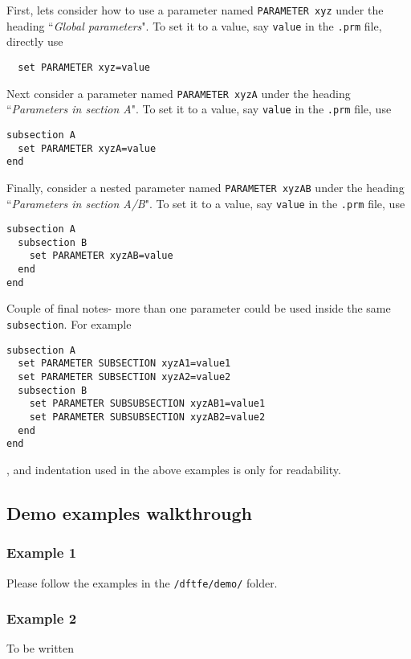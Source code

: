 First, lets consider how to use a parameter named \verb|PARAMETER xyz| under the heading ``{\it Global parameters}". To set it to a value, say \verb|value|  in the  \verb|.prm| file, directly use
\begin{verbatim}
  set PARAMETER xyz=value
\end{verbatim}
Next consider a parameter named \verb|PARAMETER xyzA| under the heading ``{\it Parameters in section A}". To set it to a value, say \verb|value|  in the  \verb|.prm| file, use 
\begin{verbatim}
subsection A
  set PARAMETER xyzA=value
end
\end{verbatim}
Finally, consider a nested parameter named  \verb|PARAMETER xyzAB| under the heading ``{\it Parameters in section A/B}". To set it to a value, say \verb|value|  in the  \verb|.prm| file, use 
\begin{verbatim}
subsection A
  subsection B
    set PARAMETER xyzAB=value
  end
end
\end{verbatim}
Couple of final notes- more than one parameter could be used inside the same \verb|subsection|. For example
\begin{verbatim}
subsection A
  set PARAMETER SUBSECTION xyzA1=value1
  set PARAMETER SUBSECTION xyzA2=value2
  subsection B
    set PARAMETER SUBSUBSECTION xyzAB1=value1
    set PARAMETER SUBSUBSECTION xyzAB2=value2
  end
end
\end{verbatim}
, and indentation used in the above examples is only for readability.
\subsection{Demo examples walkthrough}
\subsubsection{Example 1}
Please follow the examples in the \verb|/dftfe/demo/| folder.

\subsubsection{Example 2}
To be written
